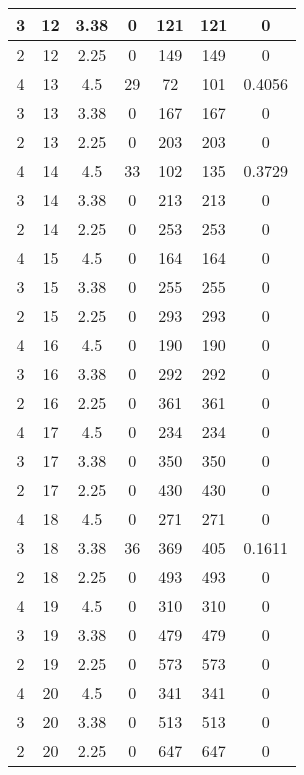 \documentclass[letterpaper, 12pt]{article}
\begin{document}
\begin{longtable}{|c|c|c|c|c|c|c|}
\hline
3 & 12 & 3.38 & 0 & 121 & 121 & 0 \\
\hline
2 & 12 & 2.25 & 0 & 149 & 149 & 0 \\
\hline
4 & 13 & 4.5 & 29 & 72 & 101 & 0.4056 \\
\hline
3 & 13 & 3.38 & 0 & 167 & 167 & 0 \\
\hline
2 & 13 & 2.25 & 0 & 203 & 203 & 0 \\
\hline
4 & 14 & 4.5 & 33 & 102 & 135 & 0.3729 \\
\hline
3 & 14 & 3.38 & 0 & 213 & 213 & 0 \\
\hline
2 & 14 & 2.25 & 0 & 253 & 253 & 0 \\
\hline
4 & 15 & 4.5 & 0 & 164 & 164 & 0 \\
\hline
3 & 15 & 3.38 & 0 & 255 & 255 & 0 \\
\hline
2 & 15 & 2.25 & 0 & 293 & 293 & 0 \\
\hline
4 & 16 & 4.5 & 0 & 190 & 190 & 0 \\
\hline
3 & 16 & 3.38 & 0 & 292 & 292 & 0 \\
\hline
2 & 16 & 2.25 & 0 & 361 & 361 & 0 \\
\hline
4 & 17 & 4.5 & 0 & 234 & 234 & 0 \\
\hline
3 & 17 & 3.38 & 0 & 350 & 350 & 0 \\
\hline
2 & 17 & 2.25 & 0 & 430 & 430 & 0 \\
\hline
4 & 18 & 4.5 & 0 & 271 & 271 & 0 \\
\hline
3 & 18 & 3.38 & 36 & 369 & 405 & 0.1611 \\
\hline
2 & 18 & 2.25 & 0 & 493 & 493 & 0 \\
\hline
4 & 19 & 4.5 & 0 & 310 & 310 & 0 \\
\hline
3 & 19 & 3.38 & 0 & 479 & 479 & 0 \\
\hline
2 & 19 & 2.25 & 0 & 573 & 573 & 0 \\
\hline
4 & 20 & 4.5 & 0 & 341 & 341 & 0 \\
\hline
3 & 20 & 3.38 & 0 & 513 & 513 & 0 \\
\hline
2 & 20 & 2.25 & 0 & 647 & 647 & 0 \\
\hline
\end{longtable}
\end{document}

